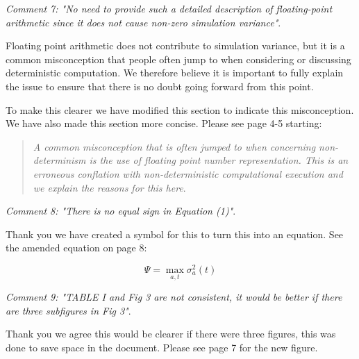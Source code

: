 \documentclass[11pt, a4paper]{letter} %
\begin{document}
\begin{letter}
\bigskip

\textit{Comment 7: "No need to provide such a detailed description of floating-point arithmetic since it does not cause non-zero simulation variance"}.

Floating point arithmetic does not contribute to simulation variance, but it is a common misconception that people often jump to when considering or discussing deterministic computation. We therefore believe it is important to fully explain the issue to ensure that there is no doubt going forward from this point.

To make this clearer we have modified this section to indicate this misconception. We have also made this section more concise. Please see page 4-5 starting:
\begin{quote}
\textit{A common misconception that is often jumped to when concerning non-determinism is the use of floating point number representation. This is an erroneous conflation with non-deterministic computational execution and we explain the reasons for this here}.
\end{quote}

\bigskip

\textit{Comment 8: "There is no equal sign in Equation (1)"}.

Thank you we have created a symbol for this to turn this into an equation. See the amended equation on page 8:

\begin{equation} \label{eq:max_sigma}
\Psi = \max_{a,t}\sigma_a^{2}(t)
\end{equation}


\bigskip

\textit{Comment 9: "TABLE I and Fig 3 are not consistent, it would be better if there are three subfigures in Fig 3"}.

Thank you we agree this would be clearer if there were three figures, this was done to save space in the document. Please see page 7 for the new figure.




\end{letter}
\end{document}
